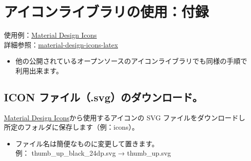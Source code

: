 \documentclass[a5j,10pt]{ltjarticle}
\newcommand{\bsgithub}{}
\begin{document}
\newpage

\section{アイコンライブラリの使用：付録}
使用例：\href{https://fonts.google.com/icons}{Material Design Icons}\\
\hspace{4mm}詳細参照：\href{https://github.com/ru-museum/material-design-icons-latex}{material-design-icons-latex} \bsgithub

\begin{itemize}
  \item 他の公開されているオープンソースのアイコンライブラリでも同様の手順で利用出来ます。
\end{itemize}

\subsection{ICON ファイル（.svg）のダウンロード。}
\href{https://fonts.google.com/icons}{Material Design Icons}から使用するアイコンの SVG ファイルをダウンロードし所定のフォルダに保存します（例：icons）。

\begin{itemize}
  \item ファイル名は簡便なものに変更して置きます。\\
\hspace{4mm}例： thumb\_up\_black\_24dp.svg → thumb\_up.svg　
\end{itemize}
\end{document}
